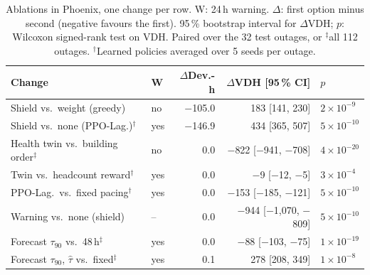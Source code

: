 \begin{table}[t]
\centering
\caption{Ablations in Phoenix, one change per row. W: 24\,h warning. $\Delta$: first option minus second (negative favours the first). 95\,\% bootstrap interval for $\Delta$VDH; $p$: Wilcoxon signed-rank test on VDH. Paired over the 32 test outages, or $^\ddagger$all 112 outages. $^\dagger$Learned policies averaged over 5 seeds per outage.}
\label{tab:ablations}
\setlength{\tabcolsep}{6pt}
\begin{tabular}{llrrl}
\toprule
Change & W & $\Delta$Dev.-h & $\Delta$VDH [95\,\% CI] & $p$ \\
\midrule
Shield vs.\ weight (greedy) & no & $-$105.0 & 183 [141, 230] & $2\times10^{-9}$ \\
Shield vs.\ none (PPO-Lag.)$^\dagger$ & yes & $-$146.9 & 434 [365, 507] & $5\times10^{-10}$ \\
Health twin vs.\ building order$^\ddagger$ & no & 0.0 & $-$822 [$-$941, $-$708] & $4\times10^{-20}$ \\
Twin vs.\ headcount reward$^\dagger$ & yes & 0.0 & $-$9 [$-$12, $-$5] & $3\times10^{-4}$ \\
PPO-Lag.\ vs.\ fixed pacing$^\dagger$ & yes & 0.0 & $-$153 [$-$185, $-$121] & $5\times10^{-10}$ \\
Warning vs.\ none (shield) & -- & 0.0 & $-$944 [$-$1{,}070, $-$809] & $5\times10^{-10}$ \\
Forecast $\tau_{90}$ vs.\ 48\,h$^\ddagger$ & yes & 0.0 & $-$88 [$-$103, $-$75] & $1\times10^{-19}$ \\
Forecast $\tau_{90}$, $\hat\tau$ vs.\ fixed$^\ddagger$ & yes & 0.1 & 278 [208, 349] & $1\times10^{-8}$ \\
\bottomrule
\end{tabular}
\end{table}
